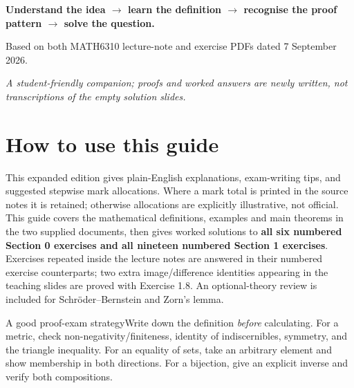 \documentclass[11pt,a4paper]{article}
\begin{document}
\begin{titlepage}\centering\vspace*{25mm}{\Huge\bfseries Metric Spaces \& Topology\par}\vspace{5mm}{\LARGE MATH6310\par}\vspace{10mm}{\Large Expanded revision textbook, intuitive explanations and mark-by-mark worked solutions\par}\vspace{7mm}{\large Sections 0 and 1: Metrics, sets, functions, equivalence relations, countability and orders\par}\vfill\begin{tcolorbox}[colback=sky,colframe=navy,width=.88\textwidth]\centering\large\textbf{Understand the idea $\to$ learn the definition $\to$ recognise the proof pattern $\to$ solve the question.}\end{tcolorbox}\vfill{\large Based on both MATH6310 lecture-note and exercise PDFs dated 7 September 2026.}\par\vspace{8mm}\textit{A student-friendly companion; proofs and worked answers are newly written, not transcriptions of the empty solution slides.}\end{titlepage}
\tableofcontents\newpage
\section{How to use this guide}
This expanded edition gives plain-English explanations, exam-writing tips, and suggested stepwise mark allocations. Where a mark total is printed in the source notes it is retained; otherwise allocations are explicitly illustrative, not official. This guide covers the mathematical definitions, examples and main theorems in the two supplied documents, then gives worked solutions to \textbf{all six numbered Section 0 exercises and all nineteen numbered Section 1 exercises}. Exercises repeated inside the lecture notes are answered in their numbered exercise counterparts; two extra image/difference identities appearing in the teaching slides are proved with Exercise 1.8. An optional-theory review is included for Schr\"oder--Bernstein and Zorn's lemma.
\begin{tipbox}{A good proof-exam strategy}Write down the definition \emph{before} calculating. For a metric, check non-negativity/finiteness, identity of indiscernibles, symmetry, and the triangle inequality. For an equality of sets, take an arbitrary element and show membership in both directions. For a bijection, give an explicit inverse and verify both compositions.\end{tipbox}
\end{document}
